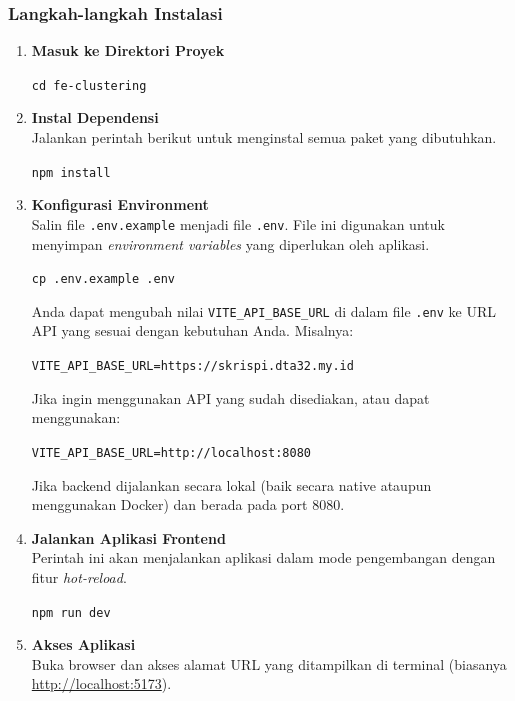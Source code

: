 \documentclass{article}
\newcommand{\inlinecode}[1]{%
    \begin{mdframed}[style=codestyle]
    \texttt{\small #1}
    \end{mdframed}
}
\begin{document}
    \subsubsection{Langkah-langkah Instalasi}
    \begin{enumerate}
        \item \textbf{Masuk ke Direktori Proyek}

        \inlinecode{cd fe-clustering}

        \item \textbf{Instal Dependensi} \\
        Jalankan perintah berikut untuk menginstal semua paket yang dibutuhkan.

        \inlinecode{npm install}

        \item \textbf{Konfigurasi Environment} \\
        Salin file \texttt{.env.example} menjadi file \texttt{.env}.
        File ini digunakan untuk menyimpan \textit{environment variables} yang diperlukan oleh aplikasi.

        \inlinecode{cp .env.example .env}

        Anda dapat mengubah nilai \texttt{VITE\_API\_BASE\_URL} di dalam file \texttt{.env} ke URL API yang sesuai dengan kebutuhan Anda.
        Misalnya:

        \inlinecode{VITE\_API\_BASE\_URL=https://skrispi.dta32.my.id}

        Jika ingin menggunakan API yang sudah disediakan, atau dapat menggunakan:

        \inlinecode{VITE\_API\_BASE\_URL=http://localhost:8080}

        Jika backend dijalankan secara lokal (baik secara native ataupun menggunakan Docker) dan berada pada port 8080.

        \item \textbf{Jalankan Aplikasi Frontend} \\
        Perintah ini akan menjalankan aplikasi dalam mode pengembangan dengan fitur \textit{hot-reload}.

        \inlinecode{npm run dev}

        \item \textbf{Akses Aplikasi} \\
        Buka browser dan akses alamat URL yang ditampilkan di terminal (biasanya \url{http://localhost:5173}).
    \end{enumerate}
\end{document}
